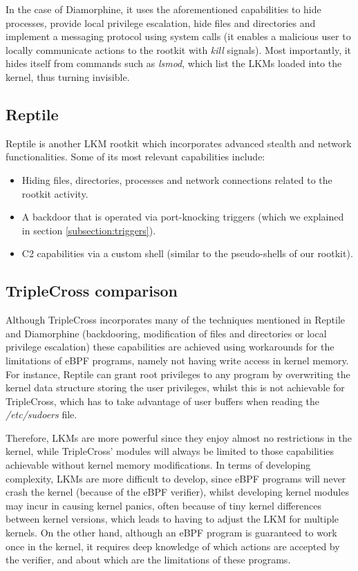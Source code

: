 In the case of Diamorphine, it uses the aforementioned capabilities to hide processes, provide local privilege escalation, hide files and directories and implement a messaging protocol using system calls (it enables a malicious user to locally communicate actions to the rootkit with \textit{kill} signals). Most importantly, it hides itself from commands such as \textit{lsmod}, which list the LKMs loaded into the kernel, thus turning invisible.

\subsection{Reptile}
Reptile \cite{reptile_github} is another LKM rootkit which incorporates advanced stealth and network functionalities. Some of its most relevant capabilities include:
\begin{itemize}
\item Hiding files, directories, processes and network connections related to the rootkit activity.
\item A backdoor that is operated via port-knocking triggers (which we explained in section \ref{subsection:triggers}).
\item C2 capabilities via a custom shell (similar to the pseudo-shells of our rootkit).
\end{itemize}

\subsection{TripleCross comparison}
Although TripleCross incorporates many of the techniques mentioned in Reptile and Diamorphine (backdooring, modification of files and directories or local privilege escalation) these capabilities are achieved using workarounds for the limitations of eBPF programs, namely not having write access in kernel memory. For instance, Reptile can grant root privileges to any program by overwriting the kernel data structure storing the user privileges, whilst this is not achievable for TripleCross, which has to take advantage of user buffers when reading the \textit{/etc/sudoers} file.

Therefore, LKMs are more powerful since they enjoy almost no restrictions in the kernel, while TripleCross' modules will always be limited to those capabilities achievable without kernel memory modifications. In terms of developing complexity, LKMs are more difficult to develop, since eBPF programs will never crash the kernel (because of the eBPF verifier), whilst developing kernel modules may incur in causing kernel panics, often because of tiny kernel differences between kernel versions, which leads to having to adjust the LKM for multiple kernels. On the other hand, although an eBPF program is guaranteed to work once in the kernel, it requires deep knowledge of which actions are accepted by the verifier, and about which are the limitations of these programs.

